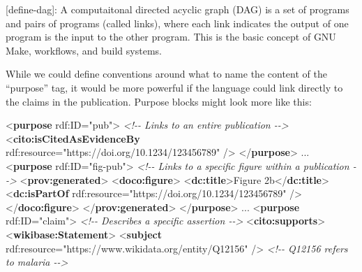 \documentclass[manuscript,authordraft]{acmart}
\newenvironment{Shaded}{}{}
\newcommand{\CommentTok}[1]{\textcolor[rgb]{0.38,0.63,0.69}{\textit{#1}}}
\newcommand{\KeywordTok}[1]{\textcolor[rgb]{0.00,0.44,0.13}{\textbf{#1}}}
\newcommand{\NormalTok}[1]{#1}
\newcommand{\OtherTok}[1]{\textcolor[rgb]{0.00,0.44,0.13}{#1}}
\newcommand{\StringTok}[1]{\textcolor[rgb]{0.25,0.44,0.63}{#1}}
\begin{document}
{[}define-dag{]}: A computaitonal directed acyclic graph (DAG) is a set
of programs and pairs of programs (called links), where each link
indicates the output of one program is the input to the other program.
This is the basic concept of GNU Make, workflows, and build systems.

While we could define conventions around what to name the content of the
``purpose'' tag, it would be more powerful if the language could link
directly to the claims in the publication. Purpose blocks might look
more like this:

\small

\begin{Shaded}
\begin{Highlighting}[]
\NormalTok{\textless{}}\KeywordTok{purpose}\OtherTok{ rdf:ID=}\StringTok{"pub"}\NormalTok{\textgreater{}}
  \CommentTok{\textless{}!{-}{-} Links to an entire publication {-}{-}\textgreater{}}
\NormalTok{  \textless{}}\KeywordTok{cito:isCitedAsEvidenceBy}\OtherTok{ rdf:resource=}\StringTok{"https://doi.org/10.1234/123456789"}\NormalTok{ /\textgreater{}}
\NormalTok{\textless{}/}\KeywordTok{purpose}\NormalTok{\textgreater{}}
\NormalTok{...}
\NormalTok{\textless{}}\KeywordTok{purpose}\OtherTok{ rdf:ID=}\StringTok{"fig{-}pub"}\NormalTok{\textgreater{}}
  \CommentTok{\textless{}!{-}{-} Links to a specific figure within a publication {-}{-}\textgreater{}}
\NormalTok{  \textless{}}\KeywordTok{prov:generated}\NormalTok{\textgreater{}}
\NormalTok{    \textless{}}\KeywordTok{doco:figure}\NormalTok{\textgreater{}}
\NormalTok{      \textless{}}\KeywordTok{dc:title}\NormalTok{\textgreater{}Figure 2b\textless{}/}\KeywordTok{dc:title}\NormalTok{\textgreater{}}
\NormalTok{      \textless{}}\KeywordTok{dc:isPartOf}\OtherTok{ rdf:resource=}\StringTok{"https://doi.org/10.1234/123456789"}\NormalTok{ /\textgreater{}}
\NormalTok{    \textless{}/}\KeywordTok{doco:figure}\NormalTok{\textgreater{}}
\NormalTok{  \textless{}/}\KeywordTok{prov:generated}\NormalTok{\textgreater{}}
\NormalTok{\textless{}/}\KeywordTok{purpose}\NormalTok{\textgreater{}}
\NormalTok{...}
\NormalTok{\textless{}}\KeywordTok{purpose}\OtherTok{ rdf:ID=}\StringTok{"claim"}\NormalTok{\textgreater{}}
  \CommentTok{\textless{}!{-}{-} Describes a specific assertion {-}{-}\textgreater{}}
\NormalTok{  \textless{}}\KeywordTok{cito:supports}\NormalTok{\textgreater{}}
\NormalTok{    \textless{}}\KeywordTok{wikibase:Statement}\NormalTok{\textgreater{}}
\NormalTok{      \textless{}}\KeywordTok{subject}\OtherTok{ rdf:resource=}\StringTok{"https://www.wikidata.org/entity/Q12156"}\NormalTok{ /\textgreater{} }\CommentTok{\textless{}!{-}{-} Q12156 refers to malaria {-}{-}\textgreater{}}

\end{Highlighting}
\end{Shaded}
\end{document}
